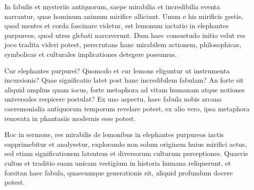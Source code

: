 In fabulis et mysteriis antiquorum, saepe mirabilia et incredibilia eventa narrantur, quae hominum animum mirifice alliciunt. Unum e his mirificis gestis, quod mentes et corda fascinare videtur, est lemonum iactatio in elephantes purpureos, quod utres glebati narraverunt. Dum haec consuetudo initio velut res joco tradita videri potest, perscrutans hanc mirabilem actionem, philosophicas, symbolicas et culturales implicationes detegere possumus.

Cur elephantes purpurei? Quomodo et cur lemons eliguntur ut instrumenta incursionis? Quae significatio latet post hanc incredibilem fabulam? An forte sit aliquid amplius quam iocus, forte metaphora ad vitam humanam atque notiones universales respicere postulat? Ex uno aspectu, haec fabula nobis arcana caeremonialia antiquorum temporum revelare potest, ex alio vero, ipsa metaphora renovata in phantasiis modernis esse potest.

Hoc in sermone, res mirabilis de lemonibus in elephantes purpureos iactis supprimebitur et analysetur, explorando non solum originem huius mirifici actus, sed etiam significationem latentem et diversorum culturum perceptiones. Quaevis cultus et traditio suam unicam vestigium in historia humana reliquerunt, et forsitan haec fabula, quaecumque generationis sit, aliquid profundum docere potest.